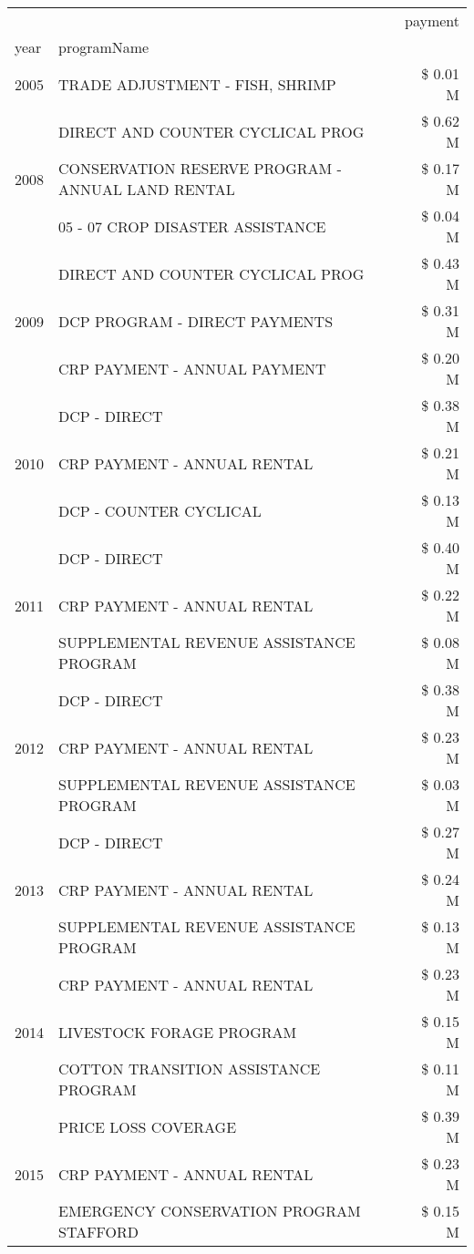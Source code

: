 \begin{tabular}{llr}
\toprule
 &  & payment \\
year & programName &  \\
\midrule
2005 & TRADE ADJUSTMENT - FISH, SHRIMP & \$ 0.01 M \\
\cline{1-3}
\multirow[t]{3}{*}{2008} & DIRECT AND COUNTER CYCLICAL PROG & \$ 0.62 M \\
 & CONSERVATION RESERVE PROGRAM - ANNUAL LAND RENTAL & \$ 0.17 M \\
 & 05 - 07 CROP DISASTER ASSISTANCE & \$ 0.04 M \\
\cline{1-3}
\multirow[t]{3}{*}{2009} & DIRECT AND COUNTER CYCLICAL PROG & \$ 0.43 M \\
 & DCP PROGRAM - DIRECT PAYMENTS & \$ 0.31 M \\
 & CRP PAYMENT - ANNUAL PAYMENT & \$ 0.20 M \\
\cline{1-3}
\multirow[t]{3}{*}{2010} & DCP - DIRECT & \$ 0.38 M \\
 & CRP PAYMENT - ANNUAL RENTAL & \$ 0.21 M \\
 & DCP - COUNTER CYCLICAL & \$ 0.13 M \\
\cline{1-3}
\multirow[t]{3}{*}{2011} & DCP - DIRECT & \$ 0.40 M \\
 & CRP PAYMENT - ANNUAL RENTAL & \$ 0.22 M \\
 & SUPPLEMENTAL REVENUE ASSISTANCE PROGRAM & \$ 0.08 M \\
\cline{1-3}
\multirow[t]{3}{*}{2012} & DCP - DIRECT & \$ 0.38 M \\
 & CRP PAYMENT - ANNUAL RENTAL & \$ 0.23 M \\
 & SUPPLEMENTAL REVENUE ASSISTANCE PROGRAM & \$ 0.03 M \\
\cline{1-3}
\multirow[t]{3}{*}{2013} & DCP - DIRECT & \$ 0.27 M \\
 & CRP PAYMENT - ANNUAL RENTAL & \$ 0.24 M \\
 & SUPPLEMENTAL REVENUE ASSISTANCE PROGRAM & \$ 0.13 M \\
\cline{1-3}
\multirow[t]{3}{*}{2014} & CRP PAYMENT - ANNUAL RENTAL & \$ 0.23 M \\
 & LIVESTOCK FORAGE PROGRAM & \$ 0.15 M \\
 & COTTON TRANSITION ASSISTANCE PROGRAM & \$ 0.11 M \\
\cline{1-3}
\multirow[t]{3}{*}{2015} & PRICE LOSS COVERAGE & \$ 0.39 M \\
 & CRP PAYMENT - ANNUAL RENTAL & \$ 0.23 M \\
 & EMERGENCY CONSERVATION PROGRAM STAFFORD & \$ 0.15 M \\

\end{tabular}
